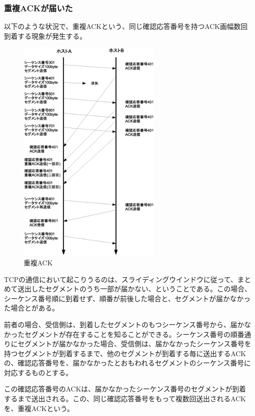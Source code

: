 \subsubsection{重複ACKが届いた}



以下のような状況で、重複ACKという、同じ確認応答番号を持つACK画幅数回到着する現象が発生する。

\begin{figure}
	\includegraphics[width=7cm, clip]{draw/tcp08n.eps}
	\caption{重複ACK}
	\label{fig:tcp08}
\end{figure}

TCPの通信において起こりうるのは、スライディングウインドウに従って、まとめて送出したセグメントのうち一部が届かない、ということである。この場合、シーケンス番号順に到着せず、順番が前後した場合と、セグメントが届かなかった場合とがある。

前者の場合、受信側は、到着したセグメントのもつシーケンス番号から、届かなかったセグメントが存在することを知ることができる。シーケンス番号の順番通りにセグメントが届かなかった場合、受信側は、届かなかったシーケンス番号を持つセグメントが到着するまで、他のセグメントが到着する毎に送出するACKの、確認応答番号を、届かなかったとおもわれるセグメントのシーケンス番号に対応するものとする。





この確認応答番号のACKは、届かなかったシーケンス番号のセグメントが到着するまで送出される。この、同じ確認応答番号をもって複数回送出されるACKを、重複ACKという。

